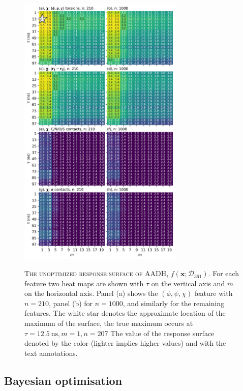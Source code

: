 \begin{figure}[p]
    \centering
    \caption[The unoptimized response surface of AADH]{\textsc{The unoptimized response surface of AADH, $f\left(\mathbf{x}; \mathcal{D}_{361}\right)$}. For each feature two heat maps are shown with $\tau$ on the vertical axis and $m$ on the horizontal axis. Panel (a) shows the  $(\phi, \psi, \chi)$ feature  with $n=210$,  panel (b) for $n=1000$,  and similarly for the remaining features. The white star denotes the approximate location of the maximum of the surface, the true maximum occurs at $\tau=\SI{12.5}{\nano\second}, m=1, n=207$  The value of the response surface denoted by the color (lighter implies higher values) and with the text annotations.}
    \includegraphics[width=0.7\textwidth]{chapters/msm_optimization/figures/aadh_response_surface_d.png}
    \label{fig:aadh_rsm}
\end{figure}

\subsection{Bayesian optimisation}\label{sec:aadh_bayes_opt}

